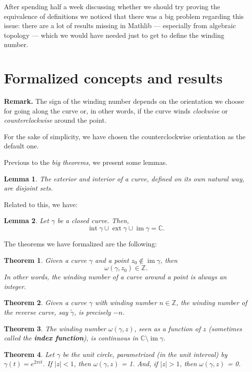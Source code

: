 \documentclass[a4paper,12pt]{article}
\newcommand{\imm}{\operatorname{im}}
\newcommand{\innt}{\operatorname{int}}
\newcommand{\ext}{\operatorname{ext}}
\newtheorem{theorem}{Theorem}
\newtheorem{lemma}{Lemma}
\begin{document}
After spending half a week discussing whether we should try proving the equivalence of definitions we
noticed that there was a big problem regarding this issue: there are a lot of results missing in Mathlib
--- especially from algebraic topology --- which we would have needed just to get to define the winding number.

\section{Formalized concepts and results}

\noindent \textbf{Remark.} The sign of the winding number depends on the orientation we choose for going along
the curve or, in other words, if the curve winds \textit{clockwise} or \textit{counterclockwise} around the point. \par
For the sake of simplicity, we have chosen the counterclockwise orientation as the default one.

Previous to the \textit{big theorems}, we present some lemmas.

\begin{lemma}
  The exterior and interior of a curve, defined on its own natural way, are disjoint sets.
\end{lemma}
Related to this, we have:

\begin{lemma}
  Let $\gamma$ be a closed curve. Then,
  $$\innt \gamma \cup \ext \gamma \cup \imm \gamma = \mathbb{C}.$$
\end{lemma}

The theorems we have formalized are the following:
\begin{theorem}
    Given a curve $\gamma$ and a point $z_0\notin \imm \gamma$, then
    $$\omega(\gamma, z_0) \in \mathbb{Z}.$$
    In other words, the winding number of a curve around a point is always an integer.
\end{theorem}

\begin{theorem}
  Given a curve $\gamma$ with winding number $n \in \mathbb{Z}$, the winding number of the reverse curve,
  say $\tilde{\gamma}$, is precisely $-n$.
\end{theorem}

\begin{theorem}
  The winding number $\omega(\gamma, z)$, seen as a function of $z$ (sometimes called the \textbf{index function}), is continuous in $\mathbb{C}\setminus \imm \gamma$.
\end{theorem}
\begin{theorem}
    Let $\gamma $ be the unit circle, parametrized (in the unit interval) by $\gamma(t) = e^{2\pi i t}$. If $|z| < 1$, then $\omega(\gamma, z)$ = 1. And, if $|z| > 1$, then $\omega(\gamma, z)$ = 0.
\end{theorem}
\end{document}
